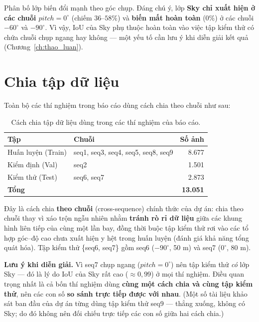 Phân bố lớp biến đổi mạnh theo góc chụp. Đáng chú ý, lớp \textbf{Sky chỉ xuất hiện ở
các chuỗi $pitch = 0^\circ$} (chiếm $36$--$58\%$) và \textbf{biến mất hoàn toàn}
($0\%$) ở các chuỗi $-60^\circ$ và $-90^\circ$. Vì vậy, IoU của Sky phụ thuộc hoàn
toàn vào việc tập kiểm thử có chứa chuỗi chụp ngang hay không --- một yếu tố cần lưu
ý khi diễn giải kết quả (Chương~\ref{ch:thao_luan}).


\section{Chia tập dữ liệu}
\label{sec:split}

Toàn bộ các thí nghiệm trong báo cáo dùng cách chia theo chuỗi như sau:

\begin{table}[H]
\centering
\caption{Cách chia tập dữ liệu dùng trong các thí nghiệm của báo cáo.}
\label{tab:split}
\begin{tabular}{l l r}
\toprule
\textbf{Tập} & \textbf{Chuỗi} & \textbf{Số ảnh} \\
\midrule
Huấn luyện (Train) & seq1, seq3, seq4, seq5, seq8, seq9 & 8.677 \\
Kiểm định (Val)    & seq2                              & 1.501 \\
Kiểm thử (Test)    & seq6, seq7                        & 2.873 \\
\midrule
\multicolumn{2}{l}{\textbf{Tổng}} & \textbf{13.051} \\
\bottomrule
\end{tabular}
\end{table}

Đây là cách chia \textbf{theo chuỗi} (cross-sequence) chính thức của dự án: chia theo
chuỗi thay vì xáo trộn ngẫu nhiên nhằm \textbf{tránh rò rỉ dữ liệu} giữa các khung
hình liên tiếp của cùng một lần bay, đồng thời buộc tập kiểm thử rơi vào các tổ hợp
góc--độ cao chưa xuất hiện y hệt trong huấn luyện (đánh giá khả năng tổng quát hóa).
Tập kiểm thử \{seq6, seq7\} gồm seq6 ($-90^\circ$, 50 m) và seq7 ($0^\circ$, 80 m).

\noindent\textbf{Lưu ý khi diễn giải.} Vì seq7 chụp ngang ($pitch = 0^\circ$) nên
tập kiểm thử \emph{có} lớp Sky --- đó là lý do IoU của Sky rất cao ($\approx 0{,}99$)
ở mọi thí nghiệm. Điều quan trọng nhất là cả bốn thí nghiệm dùng \textbf{cùng một
cách chia và cùng tập kiểm thử}, nên các con số \textbf{so sánh trực tiếp được với
nhau}. (Một số tài liệu khảo sát ban đầu của dự án từng dùng tập kiểm thử seq9 ---
thẳng xuống, không có Sky; do đó không nên đối chiếu trực tiếp các con số giữa hai
cách chia.)

